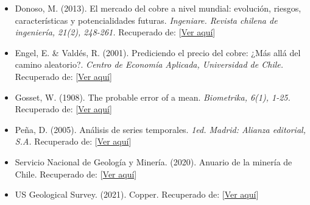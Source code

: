 \documentclass{report}
\begin{document}
\begin{itemize}
\item Donoso, M. (2013). El mercado del cobre a nivel mundial: evolución, riesgos, características y potencialidades futuras. \textit{Ingeniare. Revista chilena de ingeniería, 21(2), 248-261.} Recuperado de: [\textcolor{blue}{\href{https://dx.doi.org/10.4067/S0718-33052013000200008}{Ver aquí}}]
\vspace{0.3cm}

\item Engel, E. \& Valdés, R. (2001). Prediciendo el precio del cobre: ¿Más allá del camino aleatorio?. \textit{Centro de Economía Aplicada, Universidad de Chile.} Recuperado de:
[\textcolor{blue}{\href{https://ideas.repec.org/p/edj/ceauch/100.html}{Ver aquí}}]
\vspace{0.3cm}


\item Gosset, W. (1908). The probable error of a mean. \textit{Biometrika, 6(1), 1-25.} Recuperado de:
[\textcolor{blue}{\href{http://seismo.berkeley.edu/~kirchner/eps_120/Odds_n_ends/Students_original_paper.pdf}{Ver aquí}}]
\vspace{0.3cm}

\item Peña, D. (2005). Análisis de series temporales. \textit{1ed. Madrid: Alianza editorial, S.A.} Recuperado de: [\textcolor{blue}{\href{https://es.scribd.com/document/409580259/ANALISIS-DE-SERIES-DANIEL-PENA-pdf}{Ver aquí}}]
\vspace{0.3cm}

\item Servicio Nacional de Geología y Minería. (2020). Anuario de la minería de Chile. Recuperado de:
[\textcolor{blue}{\href{https://www.sernageomin.cl/pdf/anuario_de_\%20la\%20Mineria_de_Chile_2020_290621.pdf}{Ver aquí}}]
\vspace{0.3cm}

    \item US Geological Survey. (2021). Copper. Recuperado de:
[\textcolor{blue}{\href{https://pubs.usgs.gov/periodicals/mcs2021/mcs2021-copper.pdf}{Ver aquí}}]\\
\vspace{0.3cm}

\end{itemize}
\end{document}
